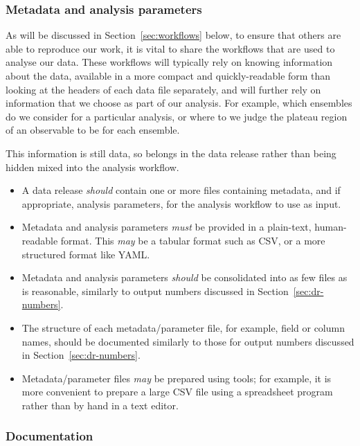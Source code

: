 \documentclass{article}
\newcommand\rfcword[1]{\emph{#1}\xspace}
\newcommand\must{\rfcword{must}}
\newcommand\should{\rfcword{should}}
\newcommand\may{\rfcword{may}}
\begin{document}
\subsubsection{Metadata and analysis parameters}

As will be discussed in Section~\ref{sec:workflows} below,
to ensure that others are able to reproduce our work,
it is vital to share the workflows that are used to analyse our data.
These workflows will typically rely on knowing information about the data,
available in a more compact and quickly-readable form than
looking at the headers of each data file separately,
and will further rely on information that we choose as part of our analysis.
For example,
which ensembles do we consider for a particular analysis,
or where to we judge the plateau region of an observable to be for each ensemble.

This information is still data,
so belongs in the data release rather than being hidden mixed into the analysis workflow.

\begin{itemize}
  \item
        A data release \should contain one or more files containing metadata,
        and if appropriate,
        analysis parameters,
        for the analysis workflow to use as input.
  \item
        Metadata and analysis parameters \must be provided in a plain-text,
        human-readable format.
        This \may be a tabular format such as CSV,
        or a more structured format like YAML\@.
  \item
        Metadata and analysis parameters \should be consolidated into as few files as is reasonable,
        similarly to output numbers discussed in Section~\ref{sec:dr-numbers}.
  \item
        The structure of each metadata/parameter file,
        for example,
        field or column names,
        should be documented similarly to those for output numbers
        discussed in Section~\ref{sec:dr-numbers}.
  \item
        Metadata/parameter files \may be prepared using tools;
        for example,
        it is more convenient to prepare a large CSV file using a spreadsheet program
        rather than by hand in a text editor.
\end{itemize}


\subsubsection{Documentation}\label{sec:dr-documentation}
\end{document}
